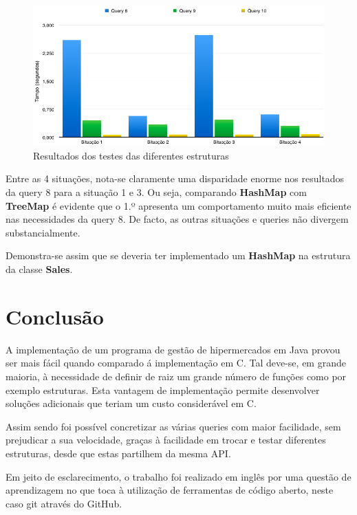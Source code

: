 \documentclass[10pt] {article}
\begin{document}
\begin{figure}[ht!]
\centering
\includegraphics[width=150mm]{graphstruct.png}
\caption{Resultados dos testes das diferentes estruturas}
\label{fig:sales}
\end{figure}

\par Entre as 4 situações, nota-se claramente uma disparidade enorme nos resultados da query 8 para a situação 1 e 3.
Ou seja, comparando \color{blue} \textbf{HashMap} \color{black} com \color{blue} \textbf{TreeMap} \color{black} é evidente que
o 1.º apresenta um comportamento muito mais eficiente nas necessidades da query 8.
De facto, as outras situações e queries não divergem substancialmente.

\par Demonstra-se assim que se deveria ter implementado um \color{blue} \textbf{HashMap} \color{black} na estrutura da classe \color{blue}\textbf{Sales}\color{black}.

\newpage

\section{Conclusão}

A implementação de um programa de gestão de hipermercados em Java provou ser mais fácil quando comparado á implementação em C.
Tal deve-se, em grande maioria, à necessidade de definir de raiz um grande número de funções como por exemplo estruturas.
Esta vantagem de implementação permite desenvolver soluções adicionais que teriam um custo considerável em C.

Assim sendo foi possível concretizar as várias queries com maior facilidade, sem prejudicar a sua velocidade, graças à facilidade em trocar e testar diferentes estruturas, desde que estas partilhem da mesma API.

Em jeito de esclarecimento, o trabalho foi realizado em inglês por uma questão de aprendizagem no que toca à utilização de ferramentas de código aberto, neste caso git através do GitHub.
\end{document}
